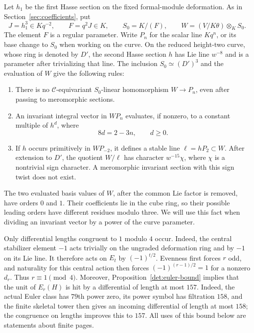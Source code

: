 \documentclass[11pt]{article}
\theoremstyle{definition}
\theoremstyle{remark}
\numberwithin{equation}{section}
\begin{document}
Let $h_1$ be the first Hasse section on the fixed formal-module
deformation. As in Section~\ref{sec:coefficients}, put
\begin{equation}
 \label{h:curve-data}
 J=h_1^3\in Kq^{-2},\qquad F=q^2J\in K,\qquad
 S_0=K/(F),\qquad W=(V/K\theta)\otimes_K S_0.
\end{equation}
The element $F$ is a regular parameter. Write $P_n$ for the scalar line
$Kq^n$, or its base change to $S_0$ when working on the curve.
On the reduced height-two curve, whose ring is denoted by $D'$,
the second Hasse section $h$ has Lie line $w^{-8}$ and is a parameter
after trivializing that line. The inclusion $S_0\simeq(D')^3$ and the
evaluation of $W$ give the following rules:
\begin{enumerate}[label=(\roman*)]
 \item There is no $\mathcal C$-equivariant $S_0$-linear homomorphism $W\to P_n$,
 even after passing to meromorphic sections.
 \item An invariant integral vector in $WP_n$ evaluates, if nonzero, to
 a constant multiple of $h^d$, where
 \begin{equation}
 \label{h:hasse-rule}
  8d=2-3n,\qquad d\geq0.
 \end{equation}
 \item If $h$ occurs primitively in $WP_{-2}$, it defines a stable line
 $\ell=hP_2\subset W$. After extension to $D'$, the quotient
 $W/\ell$ has character $w^{-15}\chi$, where $\chi$ is a nontrivial
 sign character. A meromorphic invariant section with this sign twist
 does not exist.
\end{enumerate}
The two evaluated basis values of $W$, after the common Lie factor is
removed, have orders $0$ and $1$. Their coefficients lie in the cube
ring, so their possible leading orders have different residues modulo
three. We will use this fact when dividing an invariant vector by a
power of the curve parameter.

Only differential lengths congruent to $1$ modulo $4$ occur. Indeed,
the central stabilizer element $-1$ acts trivially on the ungraded
deformation ring and by $-1$ on its Lie line. It therefore acts on
$E_t$ by $(-1)^{t/2}$. Evenness first forces $r$ odd, and naturality
for this central action then forces $(-1)^{(r-1)/2}=1$ for a nonzero
$d_r$. Thus $r\equiv1\pmod4$. Moreover,
Proposition~\ref{det:euler-bound} implies that the unit of $E_r(H)$ is
hit by a differential of length at most $157$. Indeed, the actual Euler
class has $79$th power zero, its power symbol has filtration $158$, and
the finite skeletal tower then gives an incoming differential of length
at most $158$; the congruence on lengths improves this to $157$. All
uses of this bound below are statements about finite pages.
\end{document}
